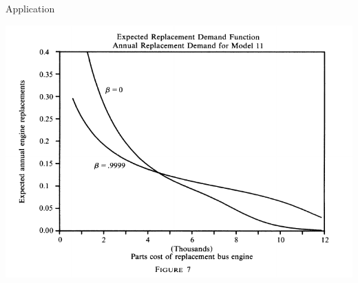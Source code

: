 \documentclass[xcolor=pdftex,dvipsnames,table,mathserif]{beamer}
\begin{document}
\begin{frame}{Application}
\begin{center}
\includegraphics[scale=.8]{./resources/RustF7.pdf}
\end{center}
\end{frame}
%
%
%
\end{document}
